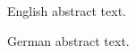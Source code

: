 \chapter{\abstractname}

English abstract text.

\vspace{0.5in}

\noindent German abstract text.


\makeatletter
{}
{\renewcommand{\abstractname}{Zusammenfassung}}
{\renewcommand{\abstractname}{Abstract}}
\makeatother



\makeatletter
{}
{\renewcommand{\abstractname}{Abstract}}
{\renewcommand{\abstractname}{Zusammenfassung}}
\makeatother